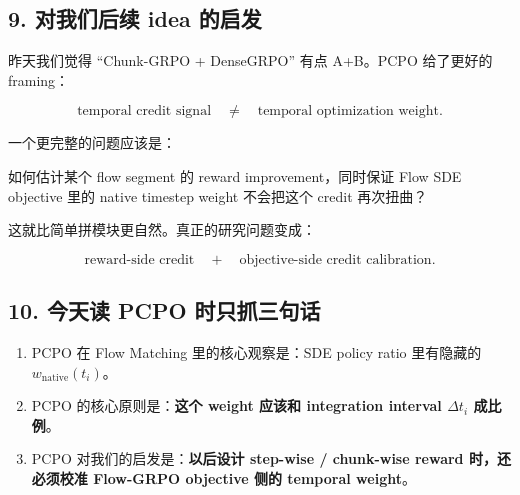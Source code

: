 \subsection{9. 对我们后续 idea 的启发}

昨天我们觉得 ``Chunk-GRPO + DenseGRPO'' 有点 A+B。PCPO 给了更好的 framing：

\[
\text{temporal credit signal}
\quad
\neq
\quad
\text{temporal optimization weight}.
\]

一个更完整的问题应该是：

\begin{summarybox}
如何估计某个 flow segment 的 reward improvement，同时保证 Flow SDE objective 里的 native timestep weight 不会把这个 credit 再次扭曲？
\end{summarybox}

这就比简单拼模块更自然。真正的研究问题变成：

\[
\text{reward-side credit}
\quad +
\quad
\text{objective-side credit calibration}.
\]

\subsection{10. 今天读 PCPO 时只抓三句话}

\begin{enumerate}[leftmargin=2em]
  \item PCPO 在 Flow Matching 里的核心观察是：SDE policy ratio 里有隐藏的 \(w_{\mathrm{native}}(t_i)\)。
  \item PCPO 的核心原则是：\textbf{这个 weight 应该和 integration interval \(\Delta t_i\) 成比例}。
  \item PCPO 对我们的启发是：\textbf{以后设计 step-wise / chunk-wise reward 时，还必须校准 Flow-GRPO objective 侧的 temporal weight}。
\end{enumerate}
